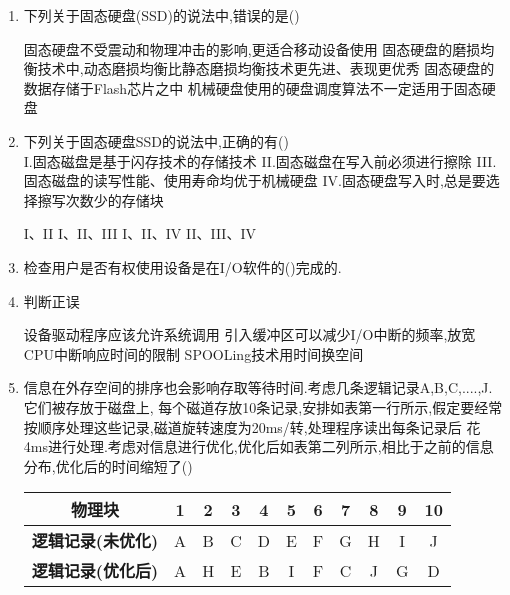 \documentclass[12pt, a4paper, oneside, UTF8]{ctexbook}
\begin{document}
\begin{enumerate}
    \item 下列关于固态硬盘(SSD)的说法中,错误的是(\qquad)
    \begin{choices}[1]
    \task 固态硬盘不受震动和物理冲击的影响,更适合移动设备使用
    \task 固态硬盘的磨损均衡技术中,动态磨损均衡比静态磨损均衡技术更先进、表现更优秀
    \task 固态硬盘的数据存储于Flash芯片之中
    \task 机械硬盘使用的硬盘调度算法不一定适用于固态硬盘
    \end{choices}

    \item 下列关于固态硬盘SSD的说法中,正确的有(\qquad)\\
    I.固态磁盘是基于闪存技术的存储技术\quad
    II.固态磁盘在写入前必须进行擦除\quad
    III.固态磁盘的读写性能、使用寿命均优于机械硬盘\quad
    IV.固态硬盘写入时,总是要选择擦写次数少的存储块
    \begin{choices}[2]
    \task I、II
    \task I、II、III
    \task I、II、IV
    \task II、III、IV
    \end{choices}

    \item 检查用户是否有权使用设备是在I/O软件的(\qquad)完成的.
    \item 判断正误
    \begin{choices}[1]
        \task 设备驱动程序应该允许系统调用
        \task 引入缓冲区可以减少I/O中断的频率,放宽CPU中断响应时间的限制
        \task SPOOLing技术用时间换空间
    \end{choices}

    \item 信息在外存空间的排序也会影响存取等待时间.考虑几条逻辑记录A,B,C,....,J.它们被存放于磁盘上,
    每个磁道存放10条记录,安排如表第一行所示,假定要经常按顺序处理这些记录,磁道旋转速度为20ms/转,处理程序读出每条记录后
    花4ms进行处理.考虑对信息进行优化,优化后如表第二列所示,相比于之前的信息分布,优化后的时间缩短了(\qquad)
    \begin{center}
    \begin{tabular}{|c|c|c|c|c|c|c|c|c|c|c|}
    \hline
    \textbf{物理块} & 1 & 2 & 3 & 4 & 5 & 6 & 7 & 8 & 9 & 10 \\ \hline 
    \textbf{逻辑记录(未优化)} & A & B & C & D & E & F & G & H & I & J \\ \hline 
    \textbf{逻辑记录(优化后)} & A & H & E & B & I & F & C & J & G & D \\ \hline 
    \end{tabular}
    \end{center}
    

\end{enumerate}
\end{document}
